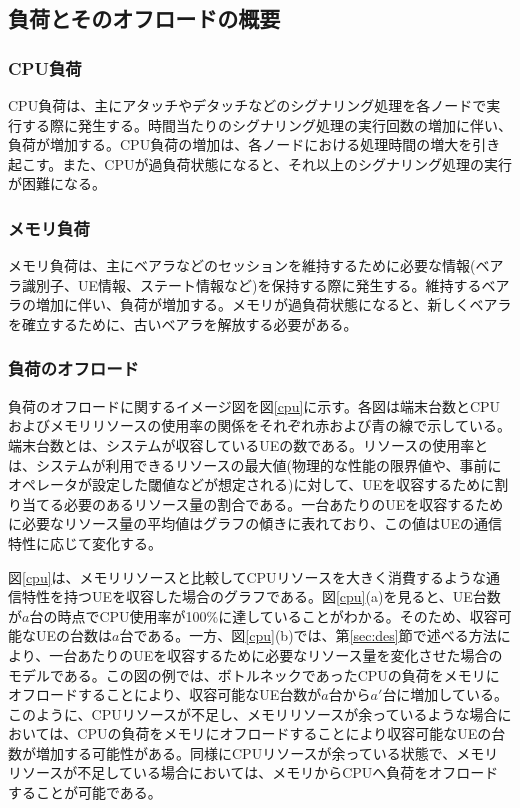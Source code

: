 \documentclass[a4j]{ujarticle}
\begin{document}
\subsection{負荷とそのオフロードの概要}
\subsubsection{CPU負荷}
CPU負荷は、主にアタッチやデタッチなどのシグナリング処理を各ノードで実行する際に発生する。時間当たりのシグナリング処理の実行回数の増加に伴い、負荷が増加する。CPU負荷の増加は、各ノードにおける処理時間の増大を引き起こす。また、CPUが過負荷状態になると、それ以上のシグナリング処理の実行が困難になる。
\subsubsection{メモリ負荷}
メモリ負荷は、主にベアラなどのセッションを維持するために必要な情報(ベアラ識別子、UE情報、ステート情報など)を保持する際に発生する。維持するベアラの増加に伴い、負荷が増加する。メモリが過負荷状態になると、新しくベアラを確立するために、古いベアラを解放する必要がある。
\subsubsection{負荷のオフロード}
負荷のオフロードに関するイメージ図を図\ref{cpu}に示す。各図は端末台数とCPUおよびメモリリソースの使用率の関係をそれぞれ赤および青の線で示している。端末台数とは、システムが収容しているUEの数である。リソースの使用率とは、システムが利用できるリソースの最大値(物理的な性能の限界値や、事前にオペレータが設定した閾値などが想定される)に対して、UEを収容するために割り当てる必要のあるリソース量の割合である。一台あたりのUEを収容するために必要なリソース量の平均値はグラフの傾きに表れており、この値はUEの通信特性に応じて変化する。

図\ref{cpu}は、メモリリソースと比較してCPUリソースを大きく消費するような通信特性を持つUEを収容した場合のグラフである。図\ref{cpu}(a)を見ると、UE台数が$a$台の時点でCPU使用率が100\%に達していることがわかる。そのため、収容可能なUEの台数は$a$台である。一方、図\ref{cpu}(b)では、第\ref{sec:des}節で述べる方法により、一台あたりのUEを収容するために必要なリソース量を変化させた場合のモデルである。この図の例では、ボトルネックであったCPUの負荷をメモリにオフロードすることにより、収容可能なUE台数が$a$台から$a'$台に増加している。このように、CPUリソースが不足し、メモリリソースが余っているような場合においては、CPUの負荷をメモリにオフロードすることにより収容可能なUEの台数が増加する可能性がある。同様にCPUリソースが余っている状態で、メモリリソースが不足している場合においては、メモリからCPUへ負荷をオフロードすることが可能である。
\end{document}

